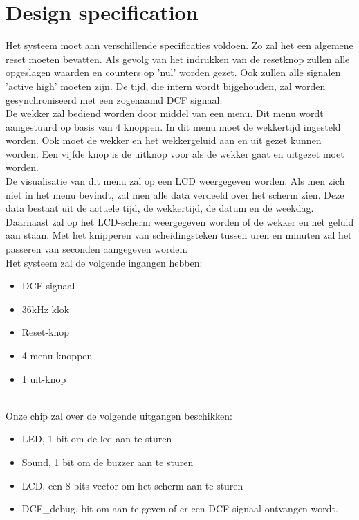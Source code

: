 \chapter{Design specification}
Het systeem moet aan verschillende specificaties voldoen. Zo zal het een algemene reset moeten bevatten. Als gevolg van het indrukken van de resetknop zullen alle opgeslagen waarden en counters op 'nul' worden gezet. Ook zullen alle signalen 'active high' moeten zijn. De tijd, die intern wordt bijgehouden, zal worden gesynchroniseerd met een zogenaamd DCF signaal.\\
De wekker zal bediend worden door middel van een menu. Dit menu wordt aangestuurd op basis van 4 knoppen. In dit menu moet de wekkertijd ingesteld worden. Ook moet de wekker en het wekkergeluid aan en uit gezet kunnen worden. Een vijfde knop is de uitknop voor als de wekker gaat en uitgezet moet worden.\\
De visualisatie van dit menu zal op een LCD weergegeven worden. Als men zich niet in het menu bevindt, zal men alle data verdeeld over het scherm zien. Deze data bestaat uit de actuele tijd, de wekkertijd, de datum en de weekdag. Daarnaast zal op het LCD-scherm weergegeven worden of de wekker en het geluid aan staan. Met het knipperen van scheidingsteken tussen uren en minuten zal het passeren van seconden aangegeven worden.\\
Het systeem zal de volgende ingangen hebben:
\begin{itemize}[nolistsep]
\item	DCF-signaal
\item	36kHz klok
\item	Reset-knop
\item	4 menu-knoppen
\item 1 uit-knop
\end{itemize}

\noindent
\\
Onze chip zal over de volgende uitgangen beschikken:
\begin{itemize}[nolistsep]
\item	LED, 1 bit om de led aan te sturen
\item	Sound, 1 bit om de buzzer aan te sturen
\item	LCD, een 8 bits vector om het scherm aan te sturen
\item	DCF\_debug, bit om aan te geven of er een DCF-signaal ontvangen wordt.
\end{itemize}
